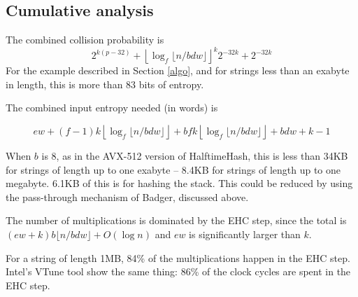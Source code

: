 \documentclass[runningheads]{llncs}
\begin{document}

\subsection{Cumulative analysis}

The combined collision probability is
\[2^{k(p-32)} + \left\lfloor \log_f \lfloor n / b d w \rfloor \right\rfloor^k 2^{-32k} + 2^{-32k}\]
For the example described in Section \ref{algo}, and for strings less than an exabyte in length, this is more than 83 bits of entropy.

The combined input entropy needed (in words) is

\[
e w
+ (f-1) k \left\lfloor\log_f \lfloor n/b d w\rfloor\right\rfloor
+ b f k \left\lfloor\log_f \lfloor n/b d w\rfloor\right\rfloor
+ b d w + k - 1
\]

When $b$ is 8, as in the AVX-512 version of HalftimeHash, this is less than 34KB for strings of length up to one exabyte -- 8.4KB for strings of length up to one megabyte.
6.1KB of this is for hashing the stack.
This could be reduced by using the pass-through mechanism of Badger, discussed above.

The number of multiplications is dominated by the EHC step, since the total is $(e w + k) b \lfloor n / b d w \rfloor + O(\log n)$ and $e w$ is significantly larger than $k$.

For a string of length 1MB, 84\% of the multiplications happen in the EHC step. %
Intel's VTune tool show the same thing: 86\% of the clock cycles are spent in the EHC step.

\end{document}
